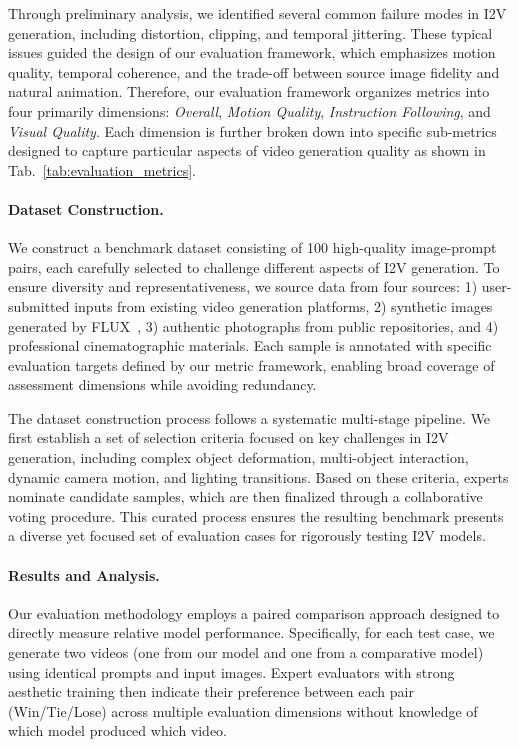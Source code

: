Through preliminary analysis, we identified several common failure modes in I2V generation, including distortion, clipping, and temporal jittering. These typical issues guided the design of our evaluation framework, which emphasizes motion quality, temporal coherence, and the trade-off between source image fidelity and natural animation.
Therefore, our evaluation framework organizes metrics into four primarily dimensions:
\emph{Overall}, \emph{Motion Quality}, \emph{Instruction Following}, and \emph{Visual Quality}.
Each dimension is further broken down into specific sub-metrics designed to
capture particular aspects of video generation quality as shown in Tab.~\ref{tab:evaluation_metrics}.



\paragraph{Dataset Construction.}

We construct a benchmark dataset consisting of 100 high-quality image-prompt pairs, each carefully selected to challenge different aspects of I2V generation. To ensure diversity and representativeness, we source data from four sources: 1) user-submitted inputs from existing video generation platforms, 2) synthetic images generated by FLUX~\citep{flux2024}, 3) authentic photographs from public repositories, and 4) professional cinematographic materials. Each sample is annotated with specific evaluation targets defined by our metric framework, enabling broad coverage of assessment dimensions while avoiding redundancy.

The dataset construction process follows a systematic multi-stage pipeline. We first establish a set of selection criteria focused on key challenges in I2V generation, including complex object deformation, multi-object interaction, dynamic camera motion, and lighting transitions. Based on these criteria, experts nominate candidate samples, which are then finalized through a collaborative voting procedure. This curated process ensures the resulting benchmark presents a diverse yet focused set of evaluation cases for rigorously testing I2V models.









\paragraph{Results and Analysis.}
\label{para:i2v_results_and_analysis}
Our evaluation methodology employs a paired comparison approach designed to directly measure relative model performance. Specifically, for each test case, we generate two videos (one from our model and one from a comparative model) using identical prompts and input images. Expert evaluators with strong aesthetic training then indicate their preference between each pair (Win/Tie/Lose) across multiple evaluation dimensions without knowledge of which model produced which video.

